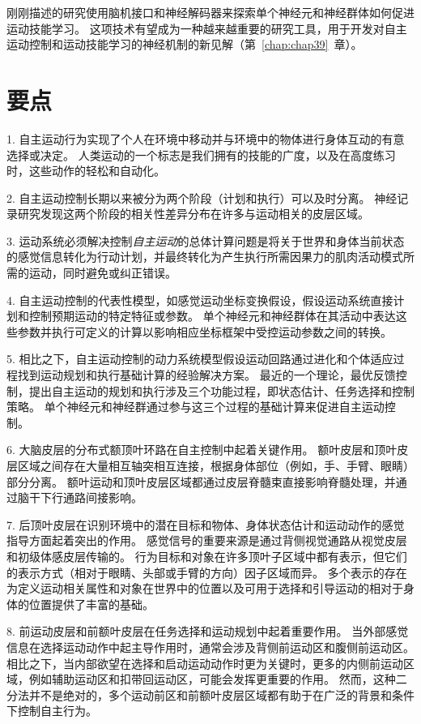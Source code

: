 刚刚描述的研究使用脑机接口和神经解码器来探索单个神经元和神经群体如何促进运动技能学习。
这项技术有望成为一种越来越重要的研究工具，用于开发对自主运动控制和运动技能学习的神经机制的新见解（第~\ref{chap:chap39}~章）。



\section{要点}

1. 自主运动行为实现了个人在环境中移动并与环境中的物体进行身体互动的有意选择或决定。
人类运动的一个标志是我们拥有的技能的广度，以及在高度练习时，这些动作的轻松和自动化。


2. 自主运动控制长期以来被分为两个阶段（计划和执行）可以及时分离。
神经记录研究发现这两个阶段的相关性差异分布在许多与运动相关的皮层区域。


3. 运动系统必须解决控制\textit{自主运动}的总体计算问题是将关于世界和身体当前状态的感觉信息转化为行动计划，并最终转化为产生执行所需因果力的肌肉活动模式所需的运动，同时避免或纠正错误。


4. 自主运动控制的代表性模型，如感觉运动坐标变换假设，假设运动系统直接计划和控制预期运动的特定特征或参数。
单个神经元和神经群体在其活动中表达这些参数并执行可定义的计算以影响相应坐标框架中受控运动参数之间的转换。


5. 相比之下，自主运动控制的动力系统模型假设运动回路通过进化和个体适应过程找到运动规划和执行基础计算的经验解决方案。
最近的一个理论，最优反馈控制，提出自主运动的规划和执行涉及三个功能过程，即状态估计、任务选择和控制策略。
单个神经元和神经群通过参与这三个过程的基础计算来促进自主运动控制。


6. 大脑皮层的分布式额顶叶环路在自主控制中起着关键作用。
额叶皮层和顶叶皮层区域之间存在大量相互轴突相互连接，根据身体部位（例如，手、手臂、眼睛）部分分离。
额叶运动和顶叶皮层区域都通过皮层脊髓束直接影响脊髓处理，并通过脑干下行通路间接影响。


7. 后顶叶皮层在识别环境中的潜在目标和物体、身体状态估计和运动动作的感觉指导方面起着突出的作用。
感觉信号的重要来源是通过背侧视觉通路从视觉皮层和初级体感皮层传输的。
行为目标和对象在许多顶叶子区域中都有表示，但它们的表示方式（相对于眼睛、头部或手臂的方向）因子区域而异。
多个表示的存在为定义运动相关属性和对象在世界中的位置以及可用于选择和引导运动的相对于身体的位置提供了丰富的基础。


8. 前运动皮层和前额叶皮层在任务选择和运动规划中起着重要作用。
当外部感觉信息在选择运动动作中起主导作用时，通常会涉及背侧前运动区和腹侧前运动区。
相比之下，当内部欲望在选择和启动运动动作时更为关键时，更多的内侧前运动区域，例如辅助运动区和扣带回运动区，可能会发挥更重要的作用。
然而，这种二分法并不是绝对的，多个运动前区和前额叶皮层区域都有助于在广泛的背景和条件下控制自主行为。


